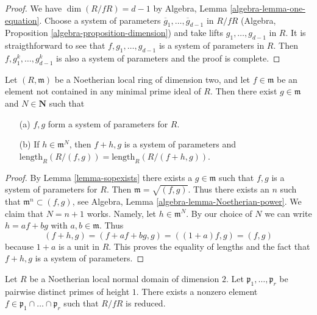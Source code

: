 \begin{proof}
We have $\dim(R/fR) = d - 1$ by
Algebra, Lemma \ref{algebra-lemma-one-equation}.
Choose a system of parameters
$\overline{g}_1, \ldots, \overline{g}_{d - 1}$
in $R/fR$ (Algebra, Proposition \ref{algebra-proposition-dimension})
and take lifts $g_1, \ldots, g_{d - 1}$ in $R$.
It is straigthforward to see that
$f, g_1, \ldots, g_{d - 1}$ is a system of parameters in $R$.
Then $f, g_1^k, \ldots, g_{d - 1}^k$ is also a system of
parameters and the proof is complete.
\end{proof}

\begin{lemma}
\label{lemma-syspar}
Let $(R,\mathfrak m)$ be a Noetherian local ring of dimension
two, and let $f \in \mathfrak m$ be an element not contained in
any minimal prime ideal of $R$. Then there exist
$g \in \mathfrak m$ and $N \in \mathbf{N}$ such that
\begin{enumerate}
\item[(a)] $f,g$ form a system of parameters for $R$.
\item[(b)] If $h \in \mathfrak m^N$, then $f + h, g$ is a
system of parameters and
$\text{length}_R (R/(f, g)) = \text{length}_R(R/(f + h, g))$.
\end{enumerate}
\end{lemma}

\begin{proof}
By Lemma \ref{lemma-sopexists} there exists a $g \in \mathfrak m$
such that $f, g$ is a system of parameters for $R$.
Then $\mathfrak m = \sqrt{(f, g)}$. Thus there exists an $n$
such that $\mathfrak m^n \subset (f, g)$, see
Algebra, Lemma \ref{algebra-lemma-Noetherian-power}. We claim that
$N = n + 1$ works.
Namely, let $h \in \mathfrak m^N$. By our choice of $N$ we can write
$h = af + bg$ with $a, b \in \mathfrak m$. Thus
$$
(f + h, g) = (f + af + bg, g) = ((1 + a)f, g) = (f, g)
$$
because $1 + a$ is a unit in $R$. This proves the equality
of lengths and the fact that $f + h, g$ is a system of parameters.
\end{proof}

\begin{lemma}
\label{lemma-radical-element}
Let $R$ be a Noetherian local normal domain of dimension $2$.
Let $\mathfrak p_1, \ldots, \mathfrak p_r$ be pairwise distinct
primes of height $1$. There exists a nonzero element
$f \in \mathfrak p_1 \cap \ldots \cap \mathfrak p_r$ such
that $R/fR$ is reduced.
\end{lemma}

